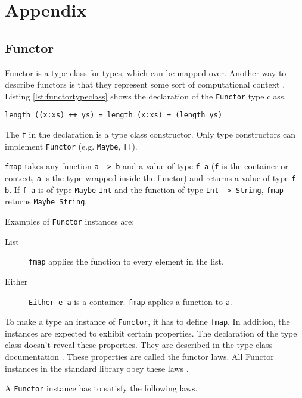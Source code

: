 
\section{Appendix}
\label{sec:appendix}

\subsection{Functor}
\label{sec:functor}

Functor is a type class for types, which can be mapped over. Another way to describe functors is that they represent some sort of computational context \cite{yorgey}. Listing \ref{lst:functortypeclass} shows the declaration of the \verb|Functor| type class.
\begin{lstlisting}[caption={Declaration of {\ttfamily Functor} type class},label={lst:functortypeclass}]
length ((x:xs) ++ ys) = length (x:xs) + (length ys)
\end{lstlisting}

The \verb|f| in the declaration is a type class constructor. Only type constructors can implement \verb|Functor| (e.g. \verb|Maybe|, \verb|[]|).

\verb|fmap| takes any function \verb|a -> b| and a value of type \verb|f a| (\verb|f| is the container or context, \verb|a| is the type wrapped inside the functor) and returns a value of type \verb|f b|. 
If \verb|f a| is of type \verb|Maybe| \verb|Int| and the function of type \verb|Int -> String|, \verb|fmap| returns \verb|Maybe String|. 

Examples of \verb|Functor| instances are:

\begin{description}
\item[List] \verb|fmap| applies the function to every element in the list.
\item[Either] \verb|Either e a| is a container. \verb|fmap| applies a function to \verb|a|.
\end{description}

To make a type an instance of \verb|Functor|, it has to define \verb|fmap|. In addition, the instances are expected to exhibit certain properties. The declaration of the type class doesn't reveal these properties. They are described in the type class documentation \cite{data.functor} \cite{Marlow_2010}. These properties are called the functor laws. All Functor instances in the standard library obey these laws \cite{yorgey} \cite{Lipovaca}.

A \verb|Functor| instance has to satisfy the following laws.

